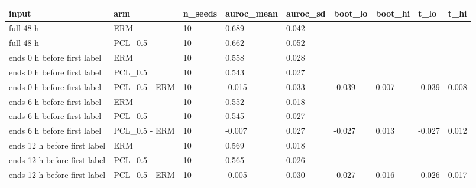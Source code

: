 \begin{tabular}{lllllllll}
\hline
input & arm & n\_seeds & auroc\_mean & auroc\_sd & boot\_lo & boot\_hi & t\_lo & t\_hi \\
\hline
full 48 h & ERM & 10 & 0.689 & 0.042 &  &  &  &  \\
full 48 h & PCL\_0.5 & 10 & 0.662 & 0.052 &  &  &  &  \\
ends 0 h before first label & ERM & 10 & 0.558 & 0.028 &  &  &  &  \\
ends 0 h before first label & PCL\_0.5 & 10 & 0.543 & 0.027 &  &  &  &  \\
ends 0 h before first label & PCL\_0.5 - ERM & 10 & -0.015 & 0.033 & -0.039 & 0.007 & -0.039 & 0.008 \\
ends 6 h before first label & ERM & 10 & 0.552 & 0.018 &  &  &  &  \\
ends 6 h before first label & PCL\_0.5 & 10 & 0.545 & 0.027 &  &  &  &  \\
ends 6 h before first label & PCL\_0.5 - ERM & 10 & -0.007 & 0.027 & -0.027 & 0.013 & -0.027 & 0.012 \\
ends 12 h before first label & ERM & 10 & 0.569 & 0.018 &  &  &  &  \\
ends 12 h before first label & PCL\_0.5 & 10 & 0.565 & 0.026 &  &  &  &  \\
ends 12 h before first label & PCL\_0.5 - ERM & 10 & -0.005 & 0.030 & -0.027 & 0.016 & -0.026 & 0.017 \\
\hline
\end{tabular}
